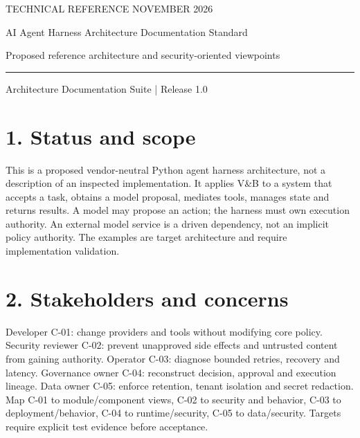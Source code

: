 \documentclass[11pt,letterpaper]{article}
\begin{document}
\thispagestyle{empty}
{\color{accent}\large TECHNICAL REFERENCE \hfill NOVEMBER 2026}\par\vspace{1.1cm}
{\color{ink}\LARGE\bfseries\raggedright AI Agent Harness Architecture Documentation Standard}\par\vspace{0.35cm}
{\Large Proposed reference architecture and security-oriented viewpoints}\par\vspace{0.55cm}
\rule{\textwidth}{0.7pt}\par\smallskip
{\small Architecture Documentation Suite | Release 1.0}\par\vspace{0.7cm}
\tableofcontents
\newpage
\section*{1. Status and scope}
This is a proposed vendor-neutral Python agent harness architecture, not a description of an inspected implementation. It applies V\&B to a system that accepts a task, obtains a model proposal, mediates tools, manages state and returns results. A model may propose an action; the harness must own execution authority. An external model service is a driven dependency, not an implicit policy authority. The examples are target architecture and require implementation validation.\par\smallskip
\section*{2. Stakeholders and concerns}
Developer C-01: change providers and tools without modifying core policy. Security reviewer C-02: prevent unapproved side effects and untrusted content from gaining authority. Operator C-03: diagnose bounded retries, recovery and latency. Governance owner C-04: reconstruct decision, approval and execution lineage. Data owner C-05: enforce retention, tenant isolation and secret redaction. Map C-01 to module/component views, C-02 to security and behavior, C-03 to deployment/behavior, C-04 to runtime/security, C-05 to data/security. Targets require explicit test evidence before acceptance.\par\smallskip
\end{document}
